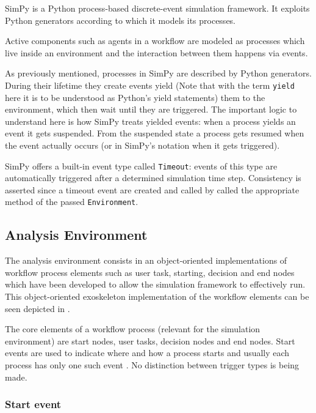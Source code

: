 \documentclass{seal_thesis}
\begin{document}
SimPy is a Python process-based discrete-event simulation framework. It exploits Python generators according to which it models its processes.

Active components such as agents in a workflow are modeled as processes which live inside an environment and the interaction between them happens via events.

As previously mentioned, processes in SimPy are described by Python generators. During their lifetime they create events yield (Note that with the term \texttt{yield} here it is to be understood as Python's yield statements) them to the environment, which then wait until they are triggered. The important logic to understand here is how SimPy treats yielded events: when a process yields an event it gets suspended. From the suspended state a process gets resumed when the event actually occurs (or in SimPy's notation when it gets triggered).

SimPy offers a built-in event type called \texttt{Timeout}: events of this type are automatically triggered after a determined simulation time step. Consistency is asserted since a timeout event are created and called by called the appropriate method of the passed \texttt{Environment}.

\subsection{Analysis Environment}

The analysis environment consists in an object-oriented implementations of workflow process elements such as user task, starting, decision and end nodes which have been developed to allow the simulation framework to effectively run. This object-oriented exoskeleton implementation of the workflow elements can be seen depicted in .


The core elements of a workflow process (relevant for the simulation environment) are start nodes, user tasks, decision nodes and end nodes. Start events are used to indicate where and how a process starts and usually each process has only one such event \cite[p. 42]{Silver2011}. No distinction between trigger types is being made.

\subsubsection{Start event}
\end{document}
